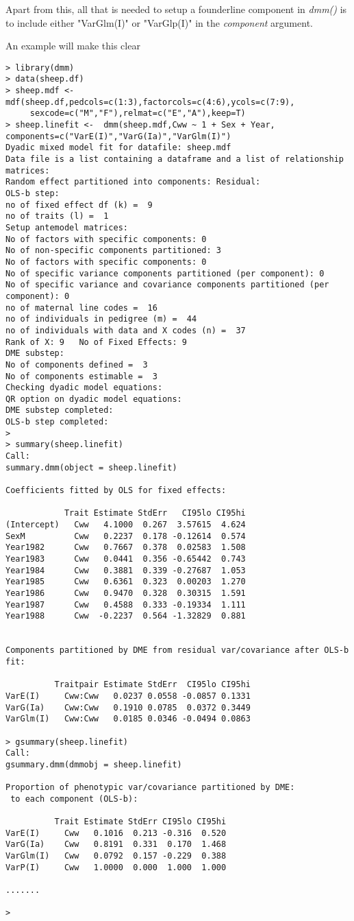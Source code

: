 \documentclass[titlepage]{article}  %
\begin{document}
Apart from this, all that is needed to setup a founderline component in {\em dmm()} is to include either "VarGlm(I)" or "VarGlp(I)" in the {\em component} argument. 

An example will make this clear
\begin{verbatim}
> library(dmm)
> data(sheep.df)
> sheep.mdf <- mdf(sheep.df,pedcols=c(1:3),factorcols=c(4:6),ycols=c(7:9),
     sexcode=c("M","F"),relmat=c("E","A"),keep=T)
> sheep.linefit <-  dmm(sheep.mdf,Cww ~ 1 + Sex + Year, components=c("VarE(I)","VarG(Ia)","VarGlm(I)")
Dyadic mixed model fit for datafile: sheep.mdf  
Data file is a list containing a dataframe and a list of relationship matrices:
Random effect partitioned into components: Residual:
OLS-b step:
no of fixed effect df (k) =  9 
no of traits (l) =  1 
Setup antemodel matrices:
No of factors with specific components: 0 
No of non-specific components partitioned: 3 
No of factors with specific components: 0 
No of specific variance components partitioned (per component): 0 
No of specific variance and covariance components partitioned (per component): 0 
no of maternal line codes =  16 
no of individuals in pedigree (m) =  44 
no of individuals with data and X codes (n) =  37 
Rank of X: 9   No of Fixed Effects: 9 
DME substep:
No of components defined =  3 
No of components estimable =  3 
Checking dyadic model equations:
QR option on dyadic model equations:
DME substep completed:
OLS-b step completed:
> 
> summary(sheep.linefit)
Call:
summary.dmm(object = sheep.linefit)

Coefficients fitted by OLS for fixed effects:

            Trait Estimate StdErr   CI95lo CI95hi
(Intercept)   Cww   4.1000  0.267  3.57615  4.624
SexM          Cww   0.2237  0.178 -0.12614  0.574
Year1982      Cww   0.7667  0.378  0.02583  1.508
Year1983      Cww   0.0441  0.356 -0.65442  0.743
Year1984      Cww   0.3881  0.339 -0.27687  1.053
Year1985      Cww   0.6361  0.323  0.00203  1.270
Year1986      Cww   0.9470  0.328  0.30315  1.591
Year1987      Cww   0.4588  0.333 -0.19334  1.111
Year1988      Cww  -0.2237  0.564 -1.32829  0.881


Components partitioned by DME from residual var/covariance after OLS-b fit:

          Traitpair Estimate StdErr  CI95lo CI95hi
VarE(I)     Cww:Cww   0.0237 0.0558 -0.0857 0.1331
VarG(Ia)    Cww:Cww   0.1910 0.0785  0.0372 0.3449
VarGlm(I)   Cww:Cww   0.0185 0.0346 -0.0494 0.0863

> gsummary(sheep.linefit)
Call:
gsummary.dmm(dmmobj = sheep.linefit)

Proportion of phenotypic var/covariance partitioned by DME:
 to each component (OLS-b):

          Trait Estimate StdErr CI95lo CI95hi
VarE(I)     Cww   0.1016  0.213 -0.316  0.520
VarG(Ia)    Cww   0.8191  0.331  0.170  1.468
VarGlm(I)   Cww   0.0792  0.157 -0.229  0.388
VarP(I)     Cww   1.0000  0.000  1.000  1.000

.......

> 
\end{verbatim}
\end{document}
